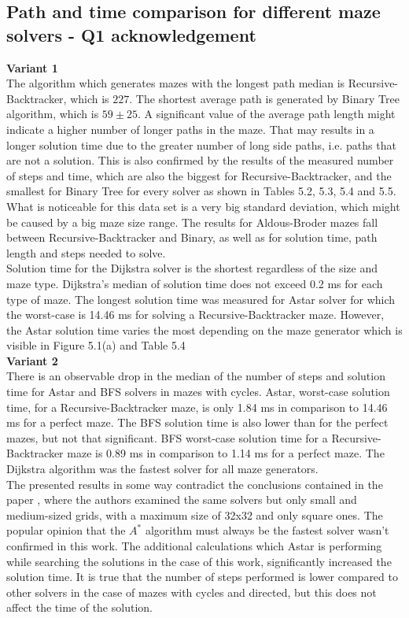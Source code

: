 \subsection{Path and time comparison for different maze solvers - Q1 acknowledgement}
\textbf{Variant 1}\\
\indent The algorithm which generates mazes with the longest path median is Recursive-Backtracker, which is $227$. The shortest average path is generated by
Binary Tree algorithm, which is $59\pm 25$. A significant value of the average path length might indicate a higher number of longer paths in the maze. That 
may results in a longer solution time due to the greater number of long side paths, i.e. paths that are not a solution. This is also confirmed by the results of
the measured number of steps and time, which are also the biggest for Recursive-Backtracker, and the smallest for Binary Tree for every solver as shown in
Tables 5.2, 5.3, 5.4 and 5.5. What is noticeable for this data set is a very big standard deviation, which might be caused by a big maze size range.
The results for Aldous-Broder mazes fall between Recursive-Backtracker and Binary, as well as for solution time, path length and steps needed to solve.\\
\indent Solution time for the Dijkstra solver is the shortest regardless of the size and maze type. Dijkstra's median of solution time does not exceed 0.2 ms for each type of maze.
The longest solution time was measured for Astar solver for which the worst-case is 14.46 ms for solving a Recursive-Backtracker maze.
However, the Astar solution time varies the most depending on the maze generator which is visible in Figure 5.1(a) and Table 5.4\\
\textbf{Variant 2}\\ 
\indent There is an observable drop in the median of the number of steps and solution time for Astar and BFS solvers in mazes with cycles. Astar, worst-case solution time, 
for a Recursive-Backtracker maze, is only 1.84 ms in comparison to 14.46 ms for a perfect maze. The BFS solution time is also lower than for the perfect mazes, but not
that significant. BFS worst-case solution time for a Recursive-Backtracker maze is 0.89 ms in comparison to 1.14 ms for a perfect maze. 
The Dijkstra algorithm was the fastest solver for all maze generators.\\
\indent The presented results in some way contradict the conclusions contained in the paper \cite{31}, where the authors examined the same solvers but 
only small and medium-sized grids, with a maximum size of 32x32 and only square ones. The popular opinion \cite{32} that the $A^*$ algorithm must always be the fastest solver wasn't
confirmed in this work. The additional calculations which Astar is performing while searching the solutions in the case of this work, significantly increased
the solution time. It is true that the number of steps performed is lower compared to other solvers in the case of mazes with cycles and directed,
but this does not affect the time of the solution.\\
